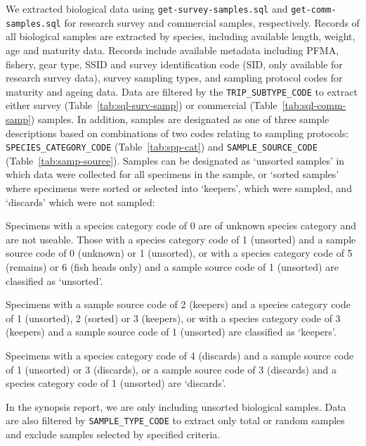 \documentclass[11pt]{book}\usepackage[]{graphicx}\usepackage[]{color}
\begin{document}
We extracted biological data using \texttt{get-survey-samples.sql} and
\texttt{get-comm-samples.sql} for research survey and commercial samples,
respectively. Records of all biological samples are extracted by species,
including available length, weight, age and maturity data. Records include
available metadata including PFMA, fishery, gear type, SSID and survey
identification code (SID, only available for research survey data), survey
sampling types, and sampling protocol codes for maturity and ageing data. Data
are filtered by the \texttt{TRIP\_SUBTYPE\_CODE} to extract either survey
(Table~\ref{tab:sql-surv-samp}) or commercial (Table~\ref{tab:sql-comm-samp})
samples. In addition, samples are designated as one of three sample descriptions
based on combinations of two codes relating to sampling protocols:
\texttt{SPECIES\_CATEGORY\_CODE} (Table~\ref{tab:spp-cat}) and
\texttt{SAMPLE\_SOURCE\_CODE} (Table~\ref{tab:samp-source}). Samples can be
designated as `unsorted samples' in which data were collected for all specimens
in the sample, or `sorted samples' where specimens were sorted or selected into
`keepers', which were sampled, and `discards' which were not sampled:

\begin{resdoclist}

\item Specimens with a species category code of 0 are of unknown species
  category and are not useable. Those with a species category code of 1
  (unsorted) and a sample source code of 0 (unknown) or 1 (unsorted), or with a
  species category code of 5 (remains) or 6 (fish heads only) and a sample
  source code of 1 (unsorted) are classified as `unsorted'.

\item Specimens with a sample source code of 2 (keepers) and a species category
  code of 1 (unsorted), 2 (sorted) or 3 (keepers), or with a species category
  code of 3 (keepers) and a sample source code of 1 (unsorted) are classified as
  `keepers'.

\item Specimens with a species category code of 4 (discards) and a sample source
  code of 1 (unsorted) or 3 (discards), or a sample source code of 3 (discards)
  and a species category code of 1 (unsorted) are `discards'.

\end{resdoclist}

In the synopsis report, we are only including unsorted biological samples. Data
are also filtered by \texttt{SAMPLE\_TYPE\_CODE} to extract only total or random
samples and exclude samples selected by specified criteria.
\end{document}
